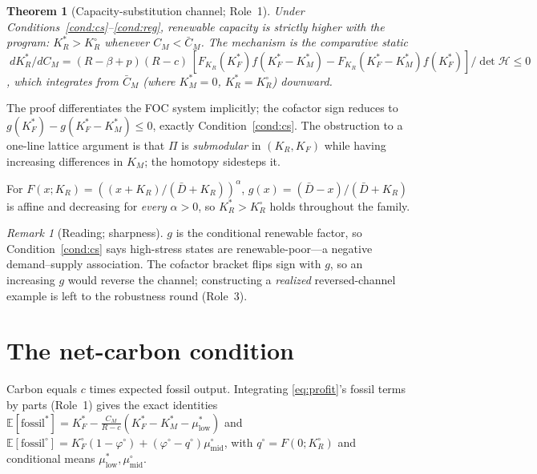 \documentclass[11pt,reqno]{amsart}
\theoremstyle{plain}
\newtheorem{theorem}{Theorem}\newtheorem{proposition}{Proposition}
\theoremstyle{definition}\newtheorem{condition}{Condition}\newtheorem{assumption}{Assumption}
\theoremstyle{remark}\newtheorem{remark}{Remark}
\newcommand{\KR}{K_R}\newcommand{\KF}{K_F}\newcommand{\KM}{K_M}
\newcommand{\KRs}{K_R^{*}}\newcommand{\KFs}{K_F^{*}}\newcommand{\KMs}{K_M^{*}}
\newcommand{\KRo}{K_R^{\circ}}\newcommand{\KFo}{K_F^{\circ}}
\newcommand{\Dbar}{\bar D}\newcommand{\CM}{C_M}\newcommand{\CF}{C_F}\newcommand{\CR}{C_R}
\newcommand{\CMbar}{\bar C_M}\newcommand{\bp}{\beta+p}\newcommand{\FKR}{F_{\!\KR}}
\newcommand{\E}{\mathbb{E}}\newcommand{\PP}{\mathbb{P}}\newcommand{\eqdef}{\vcentcolon=}
\begin{document}
\begin{theorem}[Capacity-substitution channel; Role~1]\label{thm:channel}
Under Conditions~\ref{cond:cs}--\ref{cond:reg}, renewable capacity is strictly
higher with the program: $\KRs>\KRo$ whenever $\CM<\CMbar$. The mechanism is the
comparative static
$\;d\KRs/d\CM = (R-\bp)(R-c)\,[\FKR(\KFs)f(\KFs-\KMs)-\FKR(\KFs-\KMs)f(\KFs)]/\det\mathcal H\le0$,
which integrates from $\CMbar$ (where $\KMs=0$, $\KRs=\KRo$) downward.
\end{theorem}

The proof differentiates the FOC system implicitly; the cofactor sign reduces to
$g(\KFs)-g(\KFs-\KMs)\le0$, exactly Condition~\ref{cond:cs}. The obstruction to a
one-line lattice argument is that $\Pi$ is \emph{submodular} in $(\KR,\KF)$ while
having increasing differences in $\KM$; the homotopy sidesteps it.

\begin{corollary}\label{cor:power}
For $F(x;\KR)=((x+\KR)/(\Dbar+\KR))^{\alpha}$, $g(x)=(\Dbar-x)/(\Dbar+\KR)$ is
affine and decreasing for \emph{every} $\alpha>0$, so $\KRs>\KRo$ holds throughout
the family.
\end{corollary}

\begin{remark}[Reading; sharpness]
$g$ is the conditional renewable factor, so Condition~\ref{cond:cs} says
high-stress states are renewable-poor---a negative demand--supply association. The
cofactor bracket flips sign with $g$, so an increasing $g$ would reverse the
channel; constructing a \emph{realized} reversed-channel example is left to the
robustness round (Role~3).
\end{remark}

\section{The net-carbon condition}\label{sec:carbon}

Carbon equals $c$ times expected fossil output. Integrating \eqref{eq:profit}'s
fossil terms by parts (Role~1) gives the exact identities
$\E[\text{fossil}^{*}]=\KFs-\tfrac{\CM}{R-c}(\KFs-\KMs-\mu^{*}_{\mathrm{low}})$ and
$\E[\text{fossil}^{\circ}]=\KFo(1-\varphi^{\circ})+(\varphi^{\circ}-q^{\circ})\mu^{\circ}_{\mathrm{mid}}$,
with $q^{\circ}=F(0;\KRo)$ and conditional means $\mu^{*}_{\mathrm{low}},\mu^{\circ}_{\mathrm{mid}}$.
\end{document}
